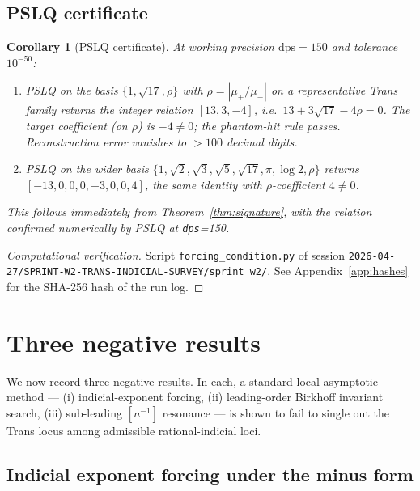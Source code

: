 \documentclass[11pt]{amsart}
\newtheorem{corollary}[theorem]{Corollary}
\theoremstyle{definition}
\theoremstyle{remark}
\newcommand{\dps}{\mathrm{dps}}
\begin{document}
\subsection{PSLQ certificate}

\begin{corollary}[PSLQ certificate]\label{thm:pslq}
At working precision $\dps = 150$ and tolerance $10^{-50}$:
\begin{enumerate}[label={\upshape(\arabic*)}]
\item PSLQ on the basis
$\{1,\sqrt{17},\rho\}$ with $\rho = |\mu_+/\mu_-|$ on a
representative Trans family returns the integer relation
$[13,3,-4]$, i.e.\ $13 + 3\sqrt{17} - 4\rho = 0$.  The target
coefficient (on $\rho$) is $-4 \ne 0$; the phantom-hit rule
passes.  Reconstruction error vanishes to $> 100$ decimal digits.
\item PSLQ on the wider basis
$\{1,\sqrt{2},\sqrt{3},\sqrt{5},\sqrt{17},\pi,\log 2,\rho\}$
returns $[-13,0,0,0,-3,0,0,4]$, the same identity with
$\rho$-coefficient $4 \ne 0$.
\end{enumerate}
This follows immediately from Theorem~\ref{thm:signature}, with the
relation confirmed numerically by PSLQ at \texttt{dps}=150.
\end{corollary}
\begin{proof}[Computational verification]
Script \texttt{forcing\_condition.py} of session
\texttt{2026-04-27/SPRINT-W2-TRANS-INDICIAL-SURVEY/sprint\_w2/}.  See
Appendix~\ref{app:hashes} for the SHA-256 hash of the run log.
\end{proof}

\section{Three negative results}\label{sec:negative}

We now record three negative results.  In each, a standard local
asymptotic method --- (i) indicial-exponent forcing, (ii) leading-order
Birkhoff invariant search, (iii) sub-leading $[n^{-1}]$ resonance ---
is shown to fail to single out the Trans locus among admissible
rational-indicial loci.

\subsection{Indicial exponent forcing under the minus form}
\label{sec:indicial}
\end{document}
